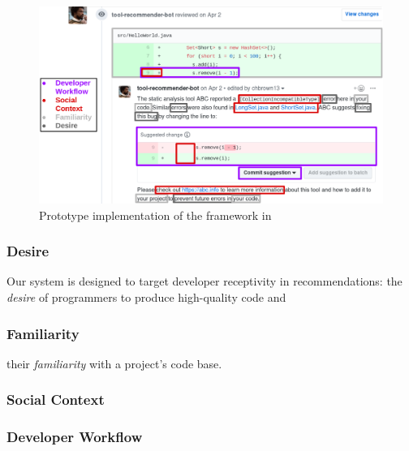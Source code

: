 \begin{figure}
\centering
	\includegraphics[width=\textwidth]{images/toolapproach.png}
	\caption{Prototype implementation of the framework in \TOOL}	
	\label{fig:approach} 
\end{figure}

\subsubsection{Desire} Our system is designed to target developer receptivity in recommendations: the \textit{desire} of programmers to produce high-quality code and 

\subsubsection{Familiarity} their \textit{familiarity} with a project's code base.

\subsubsection{Social Context}

\subsubsection{Developer Workflow}


